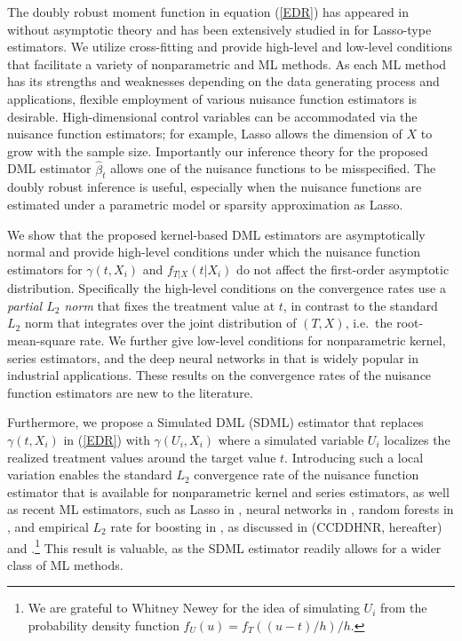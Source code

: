\documentclass[lettersize, 12pt]{article}
\begin{document}
The doubly robust moment function in equation (\ref{EDR}) has appeared in \cite{Kallus} without asymptotic theory and has been extensively studied in \cite{SUZ} for Lasso-type estimators.
We utilize cross-fitting and provide high-level and low-level conditions that facilitate a variety of nonparametric and ML methods. 
As each ML method has its strengths and weaknesses depending on the data generating process and applications,
flexible employment of various nuisance function estimators is desirable.
High-dimensional control variables can be accommodated via the nuisance function estimators; for example, Lasso allows the dimension of $X$ to grow with the sample size.
Importantly our inference theory for the proposed DML estimator $\hat \beta_t$ allows one of the nuisance functions to be misspecified.
The doubly robust inference is useful, especially when the nuisance functions are estimated 
under a parametric model or sparsity approximation as Lasso.

We show that the proposed kernel-based DML estimators are asymptotically normal and provide high-level conditions under which the nuisance function estimators for $\gamma(t, X_i)$ and $f_{T|X}(t|X_i)$ do not affect the first-order asymptotic distribution. 
Specifically the high-level conditions on the convergence rates use a {\it partial $L_2$ norm} that fixes the treatment value at $t$, in contrast to the standard $L_2$ norm that integrates over the joint distribution of $(T,X)$, i.e.\ the root-mean-square rate.
We further give low-level conditions for nonparametric kernel, series estimators, 
and the deep neural networks in \cite{Farrell18} that is widely popular in industrial applications.
These results on the convergence rates of the nuisance function estimators are new to the literature.


Furthermore, we propose a Simulated DML (SDML) estimator that replaces $\gamma(t, X_i)$ in (\ref{EDR}) with $\gamma(U_i, X_i)$ where a simulated variable $U_i$ localizes the realized treatment values around the target value $t$.
Introducing such a local variation enables the standard $L_2$ convergence rate of the nuisance function estimator
that is available for nonparametric kernel and series estimators, as well as recent ML estimators, such as Lasso in \citep{BRT09AS}, neural networks in \citep{ChenWhite, SH20AS, Farrell18}, random forests in \citep{SZ20}, and empirical $L_2$ rate for boosting in \cite{LeoSpindler}, as discussed in \cite{CCDDHNR} (CCDDHNR, hereafter) and \cite{CNS21ADML}.\footnote{
We are grateful to Whitney Newey for the idea of simulating $U_i$ from the probability density function 
$f_U(u) = f_{T}\left((u-t)/h\right)/h$.
}
This result is valuable, as the SDML estimator readily allows for a wider class of ML methods.
\end{document}
